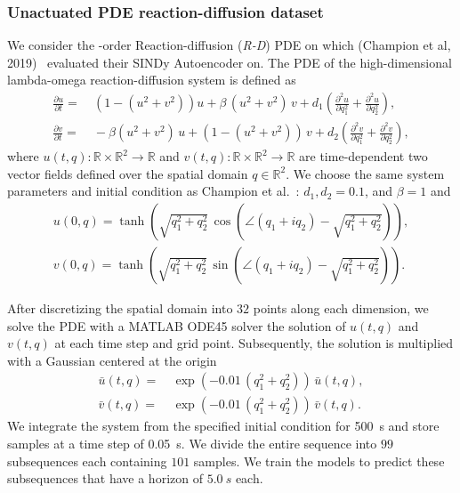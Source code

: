 \subsubsection{Unactuated PDE reaction-diffusion dataset}\label{ssub:con:reaction_diffusion_dataset}
 We consider the -order Reaction-diffusion (\emph{R-D}) \gls{PDE} on which (Champion et al, 2019)~\cite{champion2019data} evaluated their SINDy Autoencoder on. The \gls{PDE} of the high-dimensional lambda-omega reaction-diffusion system is defined as
\begin{equation}
\begin{split}
    \frac{\partial u}{\partial t} =& \: \left ( 1 - (u^2 + v^2) \right ) u + \beta \, (u^2 + v^2) \, v + d_1 \left ( \frac{\partial^2 u}{\partial q_1^2} + \frac{\partial^2 u}{\partial q_2^2} \right ),\\
    \frac{\partial v}{\partial t} =& \: -\beta (u^2 + v^2) \, u + (1 - (u^2 + v^2)) \, v + d_2 \left ( \frac{\partial^2 v}{\partial q_1^2} + \frac{\partial^2 v}{\partial q_2^2} \right ),
\end{split}
\end{equation}
where $u(t,q): \mathbb{R} \times \mathbb{R}^2 \to \mathbb{R}$ and $v(t,q): \mathbb{R} \times \mathbb{R}^2 \to \mathbb{R}$ are time-dependent two vector fields defined over the spatial domain $q \in \mathbb{R}^2$.
We choose the same system parameters and initial condition as Champion et al.~\cite{champion2019data}: $d_1, d_2 = 0.1$, and $\beta = 1$ and 
\begin{equation}
\begin{split}
    u(0,q) = \tanh \left ( \sqrt{q_1^2 + q_2^2} \, \cos \left ( \angle (q_1 + i q_2) - \sqrt{q_1^2 + q_2^2} \right ) \right ),\\
    v(0,q) = \tanh \left ( \sqrt{q_1^2 + q_2^2} \, \sin \left ( \angle (q_1 + i q_2) - \sqrt{q_1^2 + q_2^2} \right ) \right ).
\end{split}
\end{equation}

After discretizing the spatial domain into $32$ points along each dimension, we solve the \gls{PDE} with a MATLAB ODE45 solver the solution of $u(t,q)$ and $v(t,q)$ at each time step and grid point.
Subsequently, the solution is multiplied with a Gaussian centered at the origin~\cite{champion2019data}
\begin{equation}
\begin{split}
    \bar{u}(t,q) =& \: \exp(-0.01 \, (q_1^2 + q_2^2)) \, \bar{u}(t,q),\\
    \bar{v}(t,q) =& \: \exp(-0.01 \, (q_1^2 + q_2^2)) \, \bar{v}(t,q).
\end{split}
\end{equation}
We integrate the system from the specified initial condition for \SI{500}{s} and store samples at a time step of \SI{0.05}{s}. We divide the entire sequence into $99$ subsequences each containing $101$ samples. We train the models to predict these subsequences that have a horizon of $\SI{5.0}{s}$ each.

